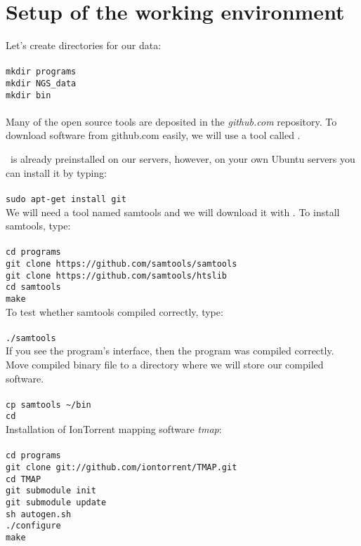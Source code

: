 \section{Setup of the working environment}
Let's create directories for our data:\\~\\
\texttt{mkdir programs \\
mkdir NGS\_data \\
mkdir bin}\\~\\

Many of the open source tools are deposited in the \textit{github.com} repository.
To download software from github.com easily, we will use a tool called \git.

\Git~is already preinstalled on our servers, however, on your own Ubuntu servers
you can install it by typing:\\~\\
\texttt{sudo apt-get install git}\\

We will need a tool named samtools and we will download it with \git.
To install samtools, type:\\~\\
\texttt{cd programs}\\
\texttt{git clone https://github.com/samtools/samtools}\\
\texttt{git clone https://github.com/samtools/htslib}\\
\texttt{cd samtools}\\
\texttt{make}\\

To test whether samtools compiled correctly, type:\\~\\
\texttt{./samtools}\\

If you see the program's interface, then the program was compiled correctly.
Move compiled binary file to a directory where we will store our compiled software.\\~\\
\texttt{cp samtools \textasciitilde/bin\\
cd}\\

Installation of IonTorrent mapping software \textit{tmap}:\\~\\
\texttt{cd programs}\\
\texttt{git clone git://github.com/iontorrent/TMAP.git}\\
\texttt{cd TMAP}\\
\texttt{git submodule init}\\
\texttt{git submodule update}\\
\texttt{sh autogen.sh}\\
\texttt{./configure}\\
\texttt{make}\\

